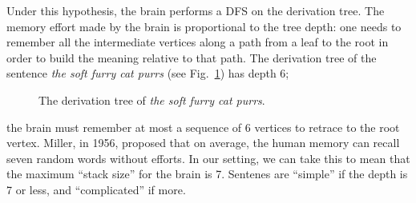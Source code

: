 \documentclass[a4paper]{book}
\theoremstyle{changebreak}                %
\begin{document}
Under this hypothesis, the brain performs a DFS on the derivation
tree. The memory effort made by the brain is proportional to the tree
depth: one needs to remember all the intermediate vertices along a
path from a leaf to the root in order to build the meaning relative to
that path. The derivation tree of the sentence {\it the soft furry cat
  purrs} (see Fig.~\ref{f:dtree}) has depth 6;
\begin{figure}[!ht]
\begin{center}
\end{center}
\caption{The derivation tree of {\it the soft furry cat purrs}.}
\label{f:dtree}
\end{figure}
the brain must remember at most a sequence of 6
vertices to retrace to the root
vertex. Miller, in 1956, proposed that on average,
the human memory can recall seven random words without efforts. In our
setting, we can take this to mean that the maximum ``stack size'' for
the brain is 7. Sentenes are ``simple'' if the depth is 7 or less, and
``complicated'' if more.
\end{document}
